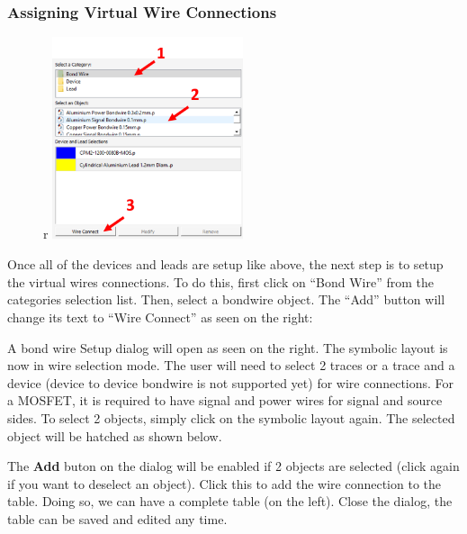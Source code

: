 \documentclass[11pt]{article}
\begin{document}
\subsubsection{Assigning Virtual Wire Connections}
\label{sec-2-3-6}
\begin{figure}{r}
\centering
\includegraphics[width=0.5\textwidth]{./figs/12_BW.png}
\end{figure}

Once all of the devices and leads are setup like above, the next step is to setup the virtual wires connections. To do this, first click on “Bond Wire” from the categories selection list. Then, select a bondwire object. The “Add” button will change its text to “Wire Connect” as seen on the right:

A bond wire Setup dialog will open as seen on the right. The symbolic layout is now in wire selection mode. The user will need to select 2 traces or a trace and a device (device to device bondwire is not supported yet) for wire connections.
For a MOSFET, it is required to have signal and power wires for signal and source sides.
To select 2 objects, simply click on the symbolic layout again. The selected object will be hatched as shown below.

The \textbf{Add} buton on the dialog will be enabled if 2 objects are selected (click again if you want to deselect an object). Click this to add the wire connection to the table. Doing so, we can have a complete table (on the left). Close the dialog, the table can be saved and edited any time.

\bigskip
\end{document}
